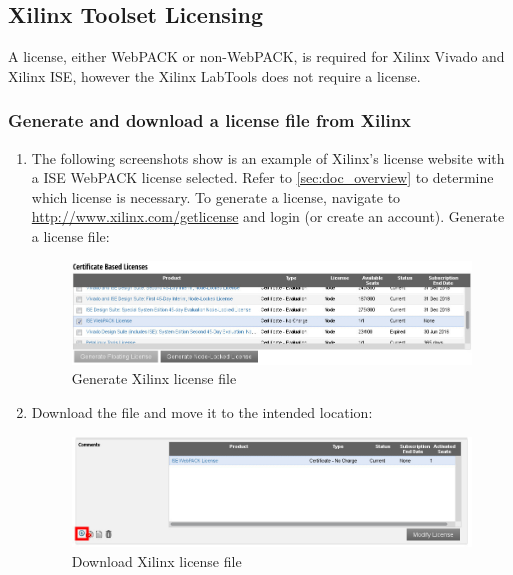 \subsection{Xilinx Toolset Licensing}
\label{xilinx}
A license, either WebPACK or non-WebPACK, is required for Xilinx Vivado and Xilinx ISE, however the Xilinx LabTools does not require a license.

\subsubsection{Generate and download a license file from Xilinx}
\begin{enumerate}
\item The following screenshots show is an example of Xilinx's license website with a ISE WebPACK license selected. Refer to \ref{sec:doc_overview} to determine which license is necessary. To generate a license, navigate to \url{http://www.xilinx.com/getlicense} and login (or create an account). Generate a license file:

\begin{figure}[H]
	\centerline{\includegraphics[scale=0.5]{./figures/xilinx_license_gen.jpg}}
	\caption{Generate Xilinx license file}
\end{figure}

\item Download the file and move it to the intended location:

\begin{figure}[H]
	\centerline{\includegraphics[scale=0.5]{./figures/xilinx_license_download.jpg}}
	\caption{Download Xilinx license file}
\end{figure}
\end{enumerate}

